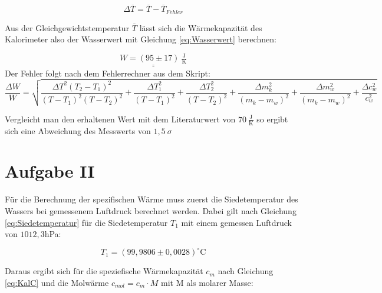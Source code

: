 \begin{equation}
    \Delta \overline{T}= \overline{T}- \overline{T}_{Fehler}
\end{equation}

Aus der Gleichgewichtstemperatur $\overline{T}$ lässt sich die Wärmekapazität des Kalorimeter also der Wasserwert mit Gleichung \ref{eq:Wasserwert} berechnen:

\[\underline{\underline{W= ( 95 \pm  17)\ \tfrac{\text{J}}{\text{K}}}}\]
Der Fehler folgt nach dem Fehlerrechner aus dem Skript:
\begin{equation}
    \frac{\Delta W}{W}=\sqrt{\frac{\Delta T^{2} \left(T_{2} - T_{1} \right)^{2}}{\left(T - T_{1}\right)^{2} \left(T - T_{2}\right)^{2}} + \frac{\Delta T_{1}^{2}}{\left(T - T_{1}\right)^{2}} + \frac{\Delta T_{2}^{2}}{\left(T - T_{2}\right)^{2}} + \frac{\Delta m_{k}^{2}}{\left(m_{k} - m_{w}\right)^{2}} + \frac{\Delta m_{w}^{2}}{\left(m_{k} - m_{w}\right)^{2}} + \frac{\Delta c_{w}^{2}}{c_{w}^{2}}}
\end{equation}

Vergleicht man den erhaltenen Wert mit dem Literaturwert von $70 \ \tfrac{\text{J}}{\text{K}}$ so ergibt sich eine Abweichung des Messwerts von $1,5 \ \sigma$

\section{Aufgabe II}

Für die Berechnung der spezifischen Wärme muss zuerst die Siedetemperatur des Wassers bei gemessenem Luftdruck berechnet werden. Dabei gilt nach Gleichung \ref{eq:Siedetemperatur}
für die Siedetemperatur $T_1$ mit einem gemessen Luftdruck von $1012,3$hPa:

\[T_1 = (99,9806 \pm 0,0028) ^\circ \text{C}\]

Daraus ergibt sich für die speziefische Wärmekapazität $c_m$ nach Gleichung \ref{eq:KalC} und die Molwärme $c_{mol} = c_m\cdot M$ mit M als molarer Masse:

